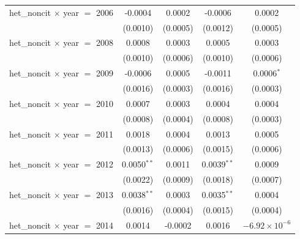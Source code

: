 \begin{tabular}{lcccc}
   het\_noncit $\times$ year $=$ 2006               & -0.0004            & 0.0002                    & -0.0006              & 0.0002\\   
                                                    & (0.0010)           & (0.0005)                  & (0.0012)             & (0.0005)\\   
   het\_noncit $\times$ year $=$ 2008               & 0.0008             & 0.0003                    & 0.0005               & 0.0003\\   
                                                    & (0.0010)           & (0.0006)                  & (0.0010)             & (0.0006)\\   
   het\_noncit $\times$ year $=$ 2009               & -0.0006            & 0.0005                    & -0.0011              & 0.0006$^{*}$\\   
                                                    & (0.0016)           & (0.0003)                  & (0.0016)             & (0.0003)\\   
   het\_noncit $\times$ year $=$ 2010               & 0.0007             & 0.0003                    & 0.0004               & 0.0004\\   
                                                    & (0.0008)           & (0.0004)                  & (0.0008)             & (0.0003)\\   
   het\_noncit $\times$ year $=$ 2011               & 0.0018             & 0.0004                    & 0.0013               & 0.0005\\   
                                                    & (0.0013)           & (0.0006)                  & (0.0015)             & (0.0006)\\   
   het\_noncit $\times$ year $=$ 2012               & 0.0050$^{**}$      & 0.0011                    & 0.0039$^{**}$        & 0.0009\\   
                                                    & (0.0022)           & (0.0009)                  & (0.0018)             & (0.0007)\\   
   het\_noncit $\times$ year $=$ 2013               & 0.0038$^{**}$      & 0.0003                    & 0.0035$^{**}$        & 0.0004\\   
                                                    & (0.0016)           & (0.0004)                  & (0.0015)             & (0.0004)\\   
   het\_noncit $\times$ year $=$ 2014               & 0.0014             & -0.0002                   & 0.0016               & $-6.92\times 10^{-6}$\\    

\end{tabular}
